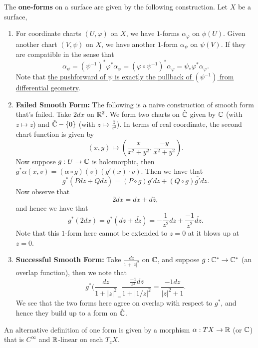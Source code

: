 \documentclass{article}
\begin{document}
{\begin{definition}
     The \textbf{one-forms} on a surface are given by the following construction. Let $X$ be a surface,
    \begin{enumerate}
        \item For coordinate charts $(U, \varphi)$ on $X$, we have $1$-forms $\alpha_\varphi$ on $\phi(U)$. Given another chart $(V, \psi)$ on $X$, we have another $1$-form $\alpha_\psi$ on $\psi(V)$. If they are compatible in the sense that
        \[\alpha_\psi = (\psi^{-1})^* \varphi^* \alpha_\varphi = (\varphi \circ \psi^{-1})^* \alpha_\varphi = \psi_* \varphi^* \alpha_\varphi.\]
        Note that \underline{the pushforward of $\psi$ is exactly the pullback of $(\psi^{-1})$ from differential geometry}.
        \item \textbf{Failed Smooth Form:} The following is a naive construction of smooth form that's failed. Take $2dx$ on $\mathbb{R}^2$. We form two charts on $\hat{\mathbb{C}}$ given by $\mathbb{C}$ (with $z \mapsto z$) and $\hat{\mathbb{C}} - \{0\}$ (with $z \mapsto \frac{\overline{z}}{z^2}$). In terms of real coordinate, the second chart function is given by
        \[(x, y) \mapsto (\frac{x}{x^2 + y^2}, \frac{-y}{x^2 + y^2}).\]
        Now suppose $g: U \to \mathbb{C}$ is holomorphic, then $g^* \alpha(x, v) = (\alpha \circ g)(v) (g'(x) \cdot v)$. Then we have that
        \[g^*(P dz + Q \overline{dz}) = (P \circ g) g' dz + (Q \circ g) \overline{g'} d\overline{z}.\]
        Now observe that 
        \[2dx = dx + d\overline{z},\]
        and hence we have that
        \[g^*(2dx) = g^*(dz + \overline{dz}) = -\frac{1}{z^2} dz + \frac{-1}{\overline{z}^2} \overline{dz}.\]
        Note that this $1$-form here cannot be extended to $z = 0$ at it blows up at $z = 0$.
        \item \textbf{Successful Smooth Form:} Take $\frac{dz}{1 + |z|^2}$ on $\mathbb{C}$, and suppose $g: \mathbb{C}^* \to \mathbb{C}^*$ (an overlap function), then we note that
        \[g^*(\frac{dz}{1 + |z|^2}_ = \frac{\frac{-1}{z^2} dz}{1 + |1/z|^2} = \frac{-1 dz}{|z|^2 + 1}.\]
        We see that the two forms here agree on overlap with respect to $g^*$, and hence they build up to a form on $\hat{\mathbb{C}}$.
    \end{enumerate}
\end{definition}

\begin{remark}
An alternative definition of one form is given by a morphism $\alpha: TX \to \mathbb{R}$ (or $\mathbb{C}$) that is $C^\infty$ and $\mathbb{R}$-linear on each $T_z X$.
\end{remark}

}
\end{document}
